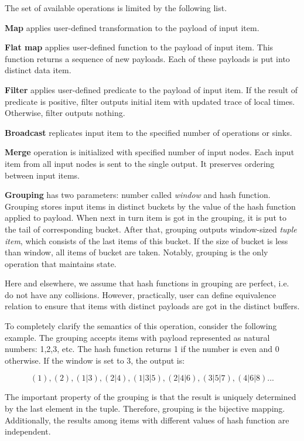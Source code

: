 
\label {fs-ops}

The set of available operations is limited by the following list.

{\bf Map} applies user-defined transformation to the payload of input item. 

{\bf Flat map} applies user-defined function to the payload of input item. This function returns a sequence of new payloads. Each of these payloads is put into distinct data item. 

{\bf Filter} applies user-defined predicate to the payload of input item. If the result of predicate is positive, filter outputs initial item with updated trace of local times. Otherwise, filter outputs nothing.

{\bf Broadcast} replicates input item to the specified number of operations or sinks. 

{\bf Merge} operation is initialized with specified number of input nodes. Each input item from all input nodes is sent to the single output. It preserves ordering between input items.

{\bf Grouping} has two parameters: number called {\it window} and hash function. Grouping stores input items in distinct buckets by the value of the hash function applied to payload. When next in turn item is got in the grouping, it is put to the tail of corresponding bucket. After that, grouping outputs window-sized {\it tuple item}, which consists of the last items of this bucket. If the size of bucket is less than window, all items of bucket are taken. Notably, grouping is the only operation that maintains state.
	
Here and elsewhere, we assume that hash functions in grouping are perfect, i.e. do not have any collisions. However, practically, user can define equivalence relation to ensure that items with distinct payloads are got in the distinct buffers.
	
To completely clarify the semantics of this operation, consider the following example. The grouping accepts items with payload represented as natural numbers: 1,2,3, etc. The hash function returns 1 if the number is even and 0 otherwise. If the window is set to 3, the output is:

\[(1), (2), (1|3), (2|4), (1|3|5), (2|4|6), (3|5|7), (4|6|8)...\]

The important property of the grouping is that the result is uniquely determined by the last element in the tuple. Therefore, grouping is the bijective mapping. Additionally, the results among items with different values of hash function are independent.

